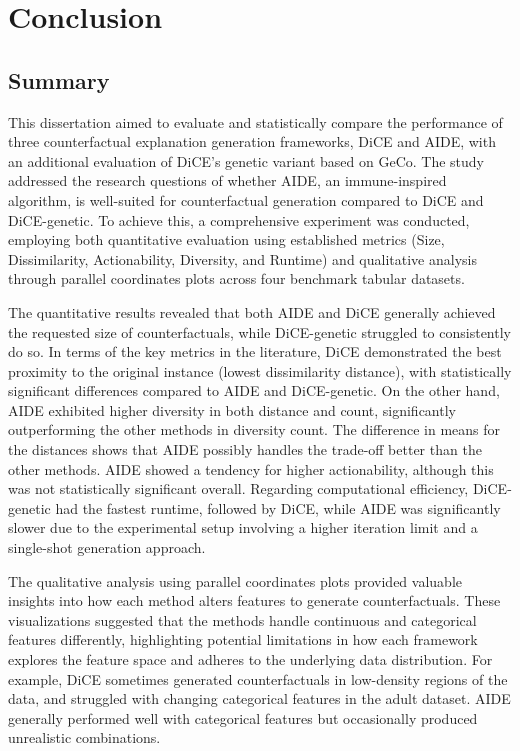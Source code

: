 \chapter{Conclusion\label{chap:conclusion}}
\section{Summary}
This dissertation aimed to evaluate and statistically compare the performance of three counterfactual explanation generation frameworks, DiCE and AIDE, with an additional evaluation of DiCE's genetic variant based on GeCo. The study addressed the research questions of whether AIDE, an immune-inspired algorithm, is well-suited for counterfactual generation compared to DiCE and DiCE-genetic. To achieve this, a comprehensive experiment was conducted, employing both quantitative evaluation using established metrics (Size, Dissimilarity, Actionability, Diversity, and Runtime) and qualitative analysis through parallel coordinates plots across four benchmark tabular datasets.

The quantitative results revealed that both AIDE and DiCE generally achieved the requested size of counterfactuals, while DiCE-genetic struggled to consistently do so. In terms of the key metrics in the literature, DiCE demonstrated the best proximity to the original instance (lowest dissimilarity distance), with statistically significant differences compared to AIDE and DiCE-genetic. On the other hand, AIDE exhibited higher diversity in both distance and count, significantly outperforming the other methods in diversity count. The difference in means for the distances shows that AIDE possibly handles the trade-off better than the other methods. AIDE showed a tendency for higher actionability, although this was not statistically significant overall. Regarding computational efficiency, DiCE-genetic had the fastest runtime, followed by DiCE, while AIDE was significantly slower due to the experimental setup involving a higher iteration limit and a single-shot generation approach.

The qualitative analysis using parallel coordinates plots provided valuable insights into how each method alters features to generate counterfactuals. These visualizations suggested that the methods handle continuous and categorical features differently, highlighting potential limitations in how each framework explores the feature space and adheres to the underlying data distribution. For example, DiCE sometimes generated counterfactuals in low-density regions of the data, and struggled with changing categorical features in the adult dataset. AIDE generally performed well with categorical features but occasionally produced unrealistic combinations.

